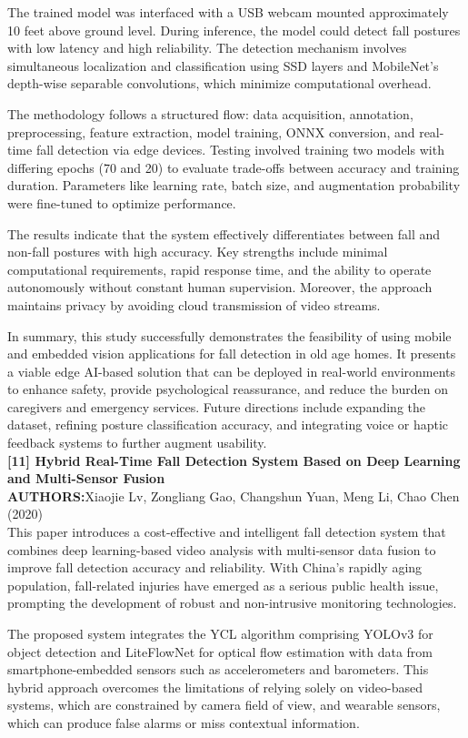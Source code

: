 \documentclass[a4paper, 12pt]{report}
\begin{document}
The trained model was interfaced with a USB webcam mounted approximately 10 feet above ground level. During inference, the model could detect fall postures with low latency and high reliability. The detection mechanism involves simultaneous localization and classification using SSD layers and MobileNet’s depth-wise separable convolutions, which minimize computational overhead.

The methodology follows a structured flow: data acquisition, annotation, preprocessing, feature extraction, model training, ONNX conversion, and real-time fall detection via edge devices. Testing involved training two models with differing epochs (70 and 20) to evaluate trade-offs between accuracy and training duration. Parameters like learning rate, batch size, and augmentation probability were fine-tuned to optimize performance.

The results indicate that the system effectively differentiates between fall and non-fall postures with high accuracy. Key strengths include minimal computational requirements, rapid response time, and the ability to operate autonomously without constant human supervision. Moreover, the approach maintains privacy by avoiding cloud transmission of video streams.

In summary, this study successfully demonstrates the feasibility of using mobile and embedded vision applications for fall detection in old age homes. It presents a viable edge AI-based solution that can be deployed in real-world environments to enhance safety, provide psychological reassurance, and reduce the burden on caregivers and emergency services. Future directions include expanding the dataset, refining posture classification accuracy, and integrating voice or haptic feedback systems to further augment usability.\\
\noindent\textbf{[11] Hybrid Real-Time Fall Detection System Based on Deep Learning and Multi-Sensor Fusion}\\
\textbf{AUTHORS:}Xiaojie Lv, Zongliang Gao, Changshun Yuan, Meng Li, Chao Chen (2020)\\
This paper introduces a cost-effective and intelligent fall detection system that combines deep learning-based video analysis with multi-sensor data fusion to improve fall detection accuracy and reliability. With China's rapidly aging population, fall-related injuries have emerged as a serious public health issue, prompting the development of robust and non-intrusive monitoring technologies.

The proposed system integrates the YCL algorithm comprising YOLOv3 for object detection and LiteFlowNet for optical flow estimation with data from smartphone-embedded sensors such as accelerometers and barometers. This hybrid approach overcomes the limitations of relying solely on video-based systems, which are constrained by camera field of view, and wearable sensors, which can produce false alarms or miss contextual information.
\end{document}
